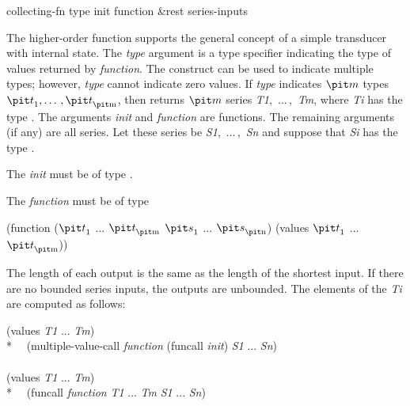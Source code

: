 \begin{defun}[Function]
collecting-fn type init function &rest series-inputs

The higher-order function  supports the general concept of
a simple transducer with internal state.  The {\it type} argument is a type
specifier indicating the type of values returned by {\it function}.
The  construct can be used to indicate multiple types; however,
{\it type} cannot indicate zero values.  If {\it type} indicates ${\it m}$ types
${\it t}_1, \ldots\,, {\it t}_{\hbox{\scriptsize\it m}}$,
then  returns ${\it m}$ series {\it
T1},~$\ldots\,$,~{\it Tm}, where {\it Ti} has the
type .  The
arguments {\it init} and {\it function} are functions.  The remaining
arguments (if any) are all series.  Let these series be {\it
S1},~$\ldots\,$,~{\it Sn} and suppose that {\it Si} has the type
.

The {\it init} must be of type 
.

The {\it function} must be of type
\begin{lisp}
(function (${\it t}_1$ ... ${\it t}_{\hbox{\scriptsize\it m}}$ ${\it s}_1$ ... ${\it s}_{\hbox{\scriptsize\it n}}$) (values ${\it t}_1$ ... ${\it t}_{\hbox{\scriptsize\it m}}$))
\end{lisp}

The length of each output is the same as the length of the shortest input.
If there are no bounded series inputs, the outputs are unbounded.
The elements of the {\it Ti} are computed as follows:
\begin{lisp}
(values {\it T1} ... {\it Tm}) {\EQ} \\*
~~(multiple-value-call {\it function} (funcall  {\it init}) {\it S1} ... {\it Sn}) \\
\\
(values {\it T1} ... {\it Tm}) {\EQ} \\*
~~(funcall {\it function} {\it T1} ... {\it Tm} {\it S1} ... {\it Sn}) 
\end{lisp}


\end{defun}
